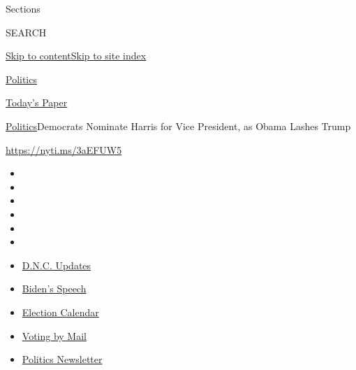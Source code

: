 Sections

SEARCH

\protect\hyperlink{site-content}{Skip to
content}\protect\hyperlink{site-index}{Skip to site index}

\href{https://www.nytimes3xbfgragh.onion/section/politics}{Politics}

\href{https://myaccount.nytimes3xbfgragh.onion/auth/login?response_type=cookie\&client_id=vi}{}

\href{https://www.nytimes3xbfgragh.onion/section/todayspaper}{Today's
Paper}

\href{/section/politics}{Politics}\textbar{}Democrats Nominate Harris
for Vice President, as Obama Lashes Trump

\url{https://nyti.ms/3aEFUW5}

\begin{itemize}
\item
\item
\item
\item
\item
\item
\end{itemize}

\begin{itemize}
\item
  \href{https://www.nytimes3xbfgragh.onion/live/2020/08/20/us/dnc-convention-election?action=click\&pgtype=Article\&state=default\&region=TOP_BANNER\&context=storylines_menu}{D.N.C.
  Updates}
\item
  \href{https://www.nytimes3xbfgragh.onion/2020/08/20/us/politics/biden-presidential-nomination-dnc.html?action=click\&pgtype=Article\&state=default\&region=TOP_BANNER\&context=storylines_menu}{Biden's
  Speech}
\item
  \href{https://www.nytimes3xbfgragh.onion/interactive/2019/us/elections/2020-presidential-election-calendar.html?action=click\&pgtype=Article\&state=default\&region=TOP_BANNER\&context=storylines_menu}{Election
  Calendar}
\item
  \href{https://www.nytimes3xbfgragh.onion/interactive/2020/08/11/us/politics/vote-by-mail-us-states.html?action=click\&pgtype=Article\&state=default\&region=TOP_BANNER\&context=storylines_menu}{Voting
  by Mail}
\item
  \href{https://www.nytimes3xbfgragh.onion/newsletters/politics?action=click\&pgtype=Article\&state=default\&region=TOP_BANNER\&context=storylines_menu}{Politics
  Newsletter}
\end{itemize}

